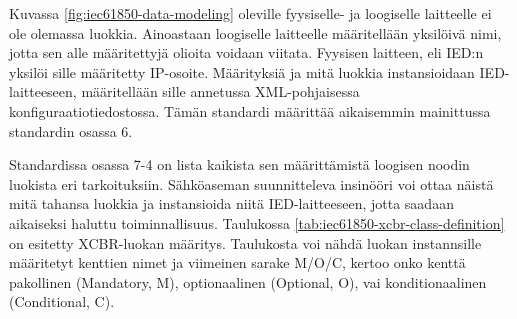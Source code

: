 Kuvassa \ref{fig:iec61850-data-modeling} oleville fyysiselle- ja loogiselle laitteelle ei ole olemassa luokkia. Ainoastaan loogiselle laitteelle määritellään yksilöivä nimi, jotta sen alle määritettyjä olioita voidaan viitata. Fyysisen laitteen, eli IED:n yksilöi sille määritetty IP-osoite. Määrityksiä ja mitä luokkia instansioidaan IED-laitteeseen, määritellään sille annetussa XML-pohjaisessa konfiguraatiotiedostossa. Tämän standardi määrittää aikaisemmin mainittussa standardin osassa 6.

Standardissa osassa 7-4 on lista kaikista sen määrittämistä loogisen noodin luokista eri tarkoituksiin. Sähköaseman suunnitteleva insinööri voi ottaa näistä mitä tahansa luokkia ja instansioida niitä IED-laitteeseen, jotta saadaan aikaiseksi haluttu toiminnallisuus. Taulukossa \ref{tab:iec61850-xcbr-class-definition} on esitetty XCBR-luokan määritys. Taulukosta voi nähdä luokan instannsille määritetyt kenttien nimet ja viimeinen sarake M/O/C, kertoo onko kenttä pakollinen (Mandatory, M), optionaalinen (Optional, O), vai konditionaalinen (Conditional, C).

